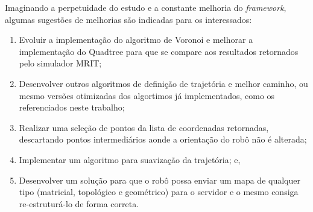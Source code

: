 Imaginando a perpetuidade do estudo e a constante melhoria do \textit{framework}, algumas sugestões de melhorias são indicadas para os interessados:

\begin{enumerate}
	\item Evoluir a implementação do algoritmo de Voronoi e melhorar a implementação do Quadtree para que se compare aos resultados retornados pelo simulador MRIT;
	\item Desenvolver outros algoritmos de definição de trajetória e melhor caminho, ou mesmo versões otimizadas dos algortimos já implementados, como os referenciados neste trabalho;
	\item Realizar uma seleção de pontos da lista de coordenadas retornadas, descartando pontos intermediários aonde a orientação do robô não é alterada;
	\item Implementar um algoritmo para suavização da trajetória; e,
	\item Desenvolver um solução para que o robô possa enviar um mapa de qualquer tipo (matricial, topológico e geométrico) para o servidor e o mesmo consiga re-estruturá-lo de forma correta.
\end{enumerate}